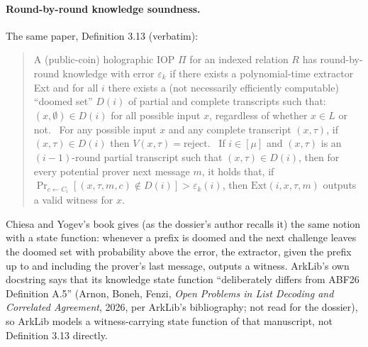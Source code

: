\paragraph{Round-by-round knowledge soundness.} The same paper, Definition 3.13 (verbatim):
\begin{quote}\small
A (public-coin) holographic IOP $\Pi$ for an indexed relation $R$ has round-by-round knowledge
with error $\varepsilon_k$ if there exists a polynomial-time extractor Ext and for all $i$ there
exists a (not necessarily efficiently computable) \enquote{doomed set} $D(i)$ of partial and
complete transcripts such that: \textbullet\ $(x, \emptyset) \in D(i)$ for all possible input
$x$, regardless of whether $x \in L$ or not. \textbullet\ For any possible input $x$ and any
complete transcript $(x, \tau)$, if $(x, \tau) \in D(i)$ then $V(x, \tau) = \mathrm{reject}$.
\textbullet\ If $i \in [\mu]$ and $(x, \tau)$ is an $(i-1)$-round partial transcript such that
$(x, \tau) \in D(i)$, then for every potential prover next message $m$, it holds that, if
$\Pr_{c \leftarrow C_i}[(x, \tau, m, c) \notin D(i)] > \varepsilon_k(i)$, then
$\mathrm{Ext}(i, x, \tau, m)$ outputs a valid witness for $x$.
\end{quote}
Chiesa and Yogev's book gives (as the dossier's author recalls it) the same notion with a state
function: whenever a prefix is doomed and the next challenge leaves the doomed set with
probability above the error, the extractor, given the prefix up to and including the prover's last
message, outputs a witness. ArkLib's own docstring says that its knowledge state function
\enquote{deliberately differs from ABF26 Definition A.5} (Arnon, Boneh, Fenzi, \emph{Open Problems
in List Decoding and Correlated Agreement}, 2026, per ArkLib's bibliography; not read for the
dossier), so ArkLib models a witness-carrying state function of that manuscript, not
Definition 3.13 directly.

